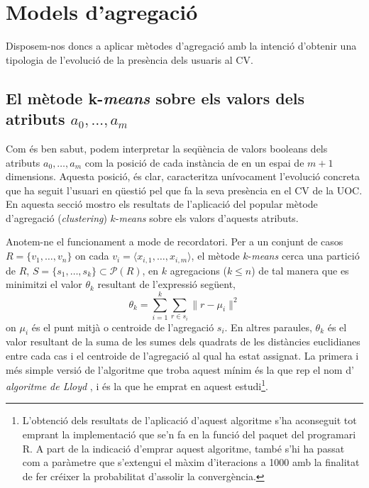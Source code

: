 \documentclass[
	a4paper,
	twoside,
	justified
]{tufte-book}
\begin{document}
\chapter{Models d'agregació} 

Disposem-nos doncs a aplicar mètodes d'agregació amb la intenció d'obtenir una tipologia de l'evolució de la presència dels usuaris al CV. 

\section{El mètode k-\emph{means} sobre els valors dels atributs $a_{0},\ldots,a_{m}$}
\label{sec:k_means_on_presence}

Com és ben sabut, podem interpretar la seqüència de valors booleans dels atributs $a_0, \dots, a_m$ com la posició de cada instància de  en un espai de $m+1$ dimensions. Aquesta posició, és clar, caracteritza unívocament l'evolució concreta que ha seguit l'usuari en qüestió pel que fa la seva presència en el CV de la UOC. En aquesta secció mostro els resultats de l'aplicació del popular mètode d'agregació (\emph{clustering}) $k$-\emph{means} \citep{macqueen67} sobre els valors d'aquests atributs. 

Anotem-ne el funcionament a mode de recordatori. Per a un conjunt de casos $R = \{v_1, \ldots, v_n \}$ on cada $v_i = \langle x_{i,1}, \ldots, x_{i,m} \rangle$, el mètode $k$-\emph{means} cerca una partició de $R$, $S=\{s_1, \ldots, s_k\} \subset \mathcal{P}(R)$, en $k$ agregacions ($k \leq n$) de tal manera que es minimitzi el valor $\theta_k$ resultant de l'expressió següent,
$$
	\theta_k = \sum_{i = 1}^k \sum_{r \in s_i} \|r - \mu_i\|^2
$$
on $\mu_i$ és el punt mitjà o centroide de l'agregació $s_i$. En altres paraules, $\theta_k$ és el valor resultant de la suma de les sumes dels quadrats de les distàncies euclidianes entre cada cas i el centroide de l'agregació al qual ha estat assignat. La primera i més simple versió de l'algoritme que troba aquest mínim és la que rep el nom d' \emph{algoritme de Lloyd} \citep{lloyd57}, i és la que he emprat en aquest estudi\footnote{L'obtenció dels resultats de l'aplicació d'aquest algoritme s'ha aconseguit tot emprant la implementació que se'n fa en la funció  del paquet  del programari R. A part de la indicació d'emprar aquest algoritme, també s'hi ha passat com a paràmetre que s'extengui el màxim d'iteracions a 1000 amb la finalitat de fer créixer la probabilitat d'assolir la convergència.}.        
\end{document}
